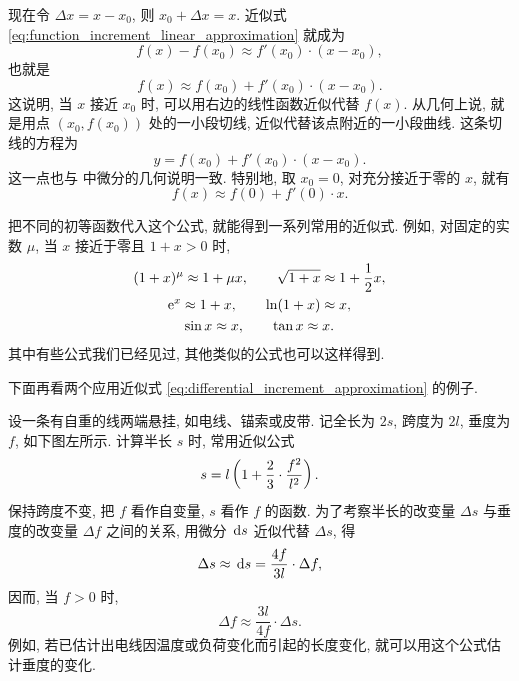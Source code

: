现在令 $\Delta x=x-x_0$, 则 $x_0+\Delta x=x$.
近似式 \eqref{eq:function_increment_linear_approximation} 就成为
$$
f(x)-f(x_0)\approx f'(x_0)\cdot(x-x_0),
$$
也就是
$$
f(x)\approx f(x_0)+f'(x_0)\cdot(x-x_0).
$$
这说明, 当 $x$ 接近 $x_0$ 时, 可以用右边的线性函数近似代替 $f(x)$.
从几何上说, 就是用点 $(x_0,f(x_0))$ 处的一小段切线,
近似代替该点附近的一小段曲线.
这条切线的方程为\footnotemark
$$
y=f(x_0)+f'(x_0)\cdot(x-x_0).
$$
这一点也与  中微分的几何说明一致.
特别地, 取 $x_0=0$, 对充分接近于零的 $x$, 就有
$$
f(x)\approx f(0)+f'(0)\cdot x.
$$

把不同的初等函数代入这个公式, 就能得到一系列常用的近似式.
例如, 对固定的实数 $\mu$, 当 $x$ 接近于零且 $1+x>0$ 时,
\begin{gather*}
(1+x)^\mu\approx1+\mu x,
\qquad \sqrt{1+x}\approx1+\frac12x,\\
\mathrm{e}^x\approx1+x,\qquad \ln(1+x)\approx x,\\
\sin x\approx x,\qquad \tan x\approx x.
\end{gather*}
其中有些公式我们已经见过, 其他类似的公式也可以这样得到.

下面再看两个应用近似式 \eqref{eq:differential_increment_approximation} 的例子.

\label{ex:hanging_cable_differential}
设一条有自重的线两端悬挂, 如电线、锚索或皮带.
记全长为 $2s$, 跨度为 $2l$, 垂度为 $f$, 如下图左所示.
计算半长 $s$ 时, 常用近似公式
$$
s=l\left( 1+\frac23\cdot\frac{f^2}{l^2} \right).
$$
保持跨度不变, 把 $f$ 看作自变量, $s$ 看作 $f$ 的函数.
为了考察半长的改变量 $\Delta s$ 与垂度的改变量 $\Delta f$ 之间的关系,
用微分 $\,\mathrm{d} s$ 近似代替 $\Delta s$, 得
$$
\Delta s\approx\,\mathrm{d} s=\frac{4f}{3l}\cdot\Delta f,
$$
因而, 当 $f>0$ 时,
$$
\Delta f\approx\frac{3l}{4f}\cdot\Delta s.
$$
例如, 若已估计出电线因温度或负荷变化而引起的长度变化,
就可以用这个公式估计垂度的变化.

